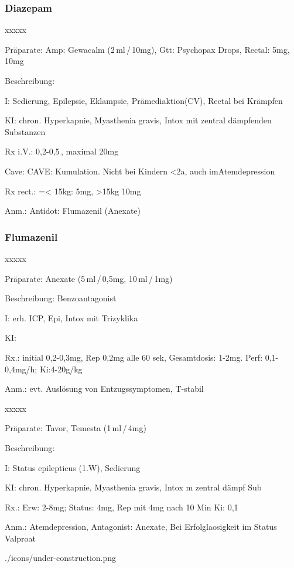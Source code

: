 \subsubsection{Diazepam}
\begin{labeling}[~]{xxxxx}
  \item[Präparate:] Amp: Gewacalm (2\,ml\,/\,10mg), Gtt: Psychopax Drops, Rectal: 5mg, 10mg
  \item[Beschreibung:] 
  \item[I:] Sedierung, Epilepsie, Eklampsie, Prämediaktion(CV), Rectal bei
  Krämpfen
  \item[KI:] chron. Hyperkapnie, Myasthenia gravis, Intox mit
zentral dämpfenden Substanzen
\item[Rx i.V.:]  0,2-0,5\,, maximal 20mg
\item[Cave:] CAVE: Kumulation. Nicht bei Kindern {\textless}2a, auch imAtemdepression
\item[Rx rect.:] ={\textless} 15kg: 5mg, {\textgreater}15kg 10mg
\item[Anm.:] Antidot: Flumazenil (Anexate)

\end{labeling}



\subsubsection{Flumazenil}

\begin{labeling}[~]{xxxxx}
  \item[Präparate:] Anexate (5\,ml\,/\,0,5mg, 10\,ml\,/\,1mg)
  \item[Beschreibung:] Benzoantagonist
  \item[I:] erh. ICP, Epi, Intox mit Trizyklika
  \item[KI:] 
  \item[Rx.:] initial 0,2-0,3mg, Rep 0,2mg alle 60 sek,
Gesamtdosis: 1-2mg. Perf: 0,1-0,4mg/h; Ki:4-20{\textmu}g/kg
\item[Anm.:] evt. Auslösung von Entzugssymptomen, T{\textdegree}-stabil
\end{labeling}




{
\begin{labeling}[~]{xxxxx}
  \item[Präparate:] Tavor, Temesta (1\,ml\,/\,4mg)
  \item[Beschreibung:]
  \item[I:] Status epilepticus (1.W), Sedierung
  \item[KI:] chron. Hyperkapnie, Myasthenia gravis, Intox m
  zentral dämpf Sub
  \item[Rx.:] Erw: 2-8mg; Status: 4mg, Rep mit 4mg nach 10
  Min\newline
  Ki: 0,1\,
  \item[Anm.:] Atemdepression, Antagonist: Anexate, Bei Erfolglaosigkeit im Status
  Valproat
\end{labeling}
}
{}
{./icons/under-construction.png}
{}
{}






